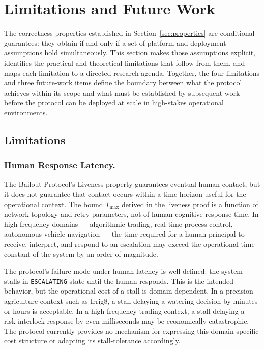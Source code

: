 \section{Limitations and Future Work}
\label{sec:limitations}

The correctness properties established in Section~\ref{sec:properties} are conditional guarantees: they obtain if and only if a set of platform and deployment assumptions hold simultaneously. This section makes those assumptions explicit, identifies the practical and theoretical limitations that follow from them, and maps each limitation to a directed research agenda. Together, the four limitations and three future-work items define the boundary between what the protocol achieves within its scope and what must be established by subsequent work before the protocol can be deployed at scale in high-stakes operational environments.

\subsection{Limitations}

\subsubsection{Human Response Latency.}

The Bailout Protocol's Liveness property guarantees eventual human contact, but it does not guarantee that contact occurs within a time horizon useful for the operational context. The bound $T_{\max}$ derived in the liveness proof is a function of network topology and retry parameters, not of human cognitive response time. In high-frequency domains --- algorithmic trading, real-time process control, autonomous vehicle navigation --- the time required for a human principal to receive, interpret, and respond to an escalation may exceed the operational time constant of the system by an order of magnitude.

The protocol's failure mode under human latency is well-defined: the system stalls in \texttt{ESCALATING} state until the human responds. This is the intended behavior, but the operational cost of a stall is domain-dependent. In a precision agriculture context such as Irrig8, a stall delaying a watering decision by minutes or hours is acceptable. In a high-frequency trading context, a stall delaying a risk-interlock response by even milliseconds may be economically catastrophic. The protocol currently provides no mechanism for expressing this domain-specific cost structure or adapting its stall-tolerance accordingly.

